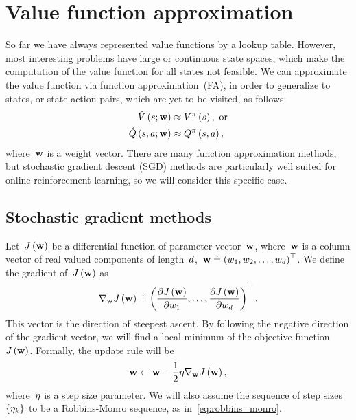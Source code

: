 \section{Value function approximation}
So far we have always represented value functions by a lookup table. However, most interesting problems have large or continuous state spaces, which make the computation of the value function for all states not feasible. We can approximate the value function via function approximation~(FA), in order to generalize to states, or state-action pairs, which are yet to be visited, as follows:
\begin{equation}
\begin{split}
	\approximatestatevalue\left(\state;\valueparameter\right)&\approx\statevalue\policyscript\left(\state\right),~\textnormal{or} \\
	\approximateactionvalue\left(\state,\action;\valueparameter\right)&\approx\actionvalue\policyscript\left(\state,\action\right),
\end{split}
\end{equation}
where~${\mathbf{w}}$ is a weight vector. There are many function approximation methods, but stochastic gradient descent (SGD) methods are particularly well suited for online reinforcement learning, so we will consider this specific case.

\subsection{Stochastic gradient methods}
Let~${J\left(\mathbf{w}\right)}$ be a differential function of parameter vector~${\mathbf{w}}$, where~${\mathbf{w}}$ is a column vector of real valued components of length~${d}$,~${\mathbf{w}\doteq\left(w_{1},w_{2},\dots,w_{d}\right)^{\top}}$. We define the gradient of~${J\left(\mathbf{w}\right)}$ as
\begin{equation}
	\nabla_{\mathbf{w}}J\left(\mathbf{w}\right)\doteq\left(\frac{\partial J\left(\mathbf{w}\right)}{\partial w_{1}},\dots,\frac{\partial J\left(\mathbf{w}\right)}{\partial w_{d}}\right)^{\top}.
\end{equation}
This vector is the direction of steepest ascent. By following the negative direction of the gradient vector, we will find a local minimum of the objective function~${J\left(\mathbf{w}\right)}$. Formally, the update rule will be
\begin{equation}
	\mathbf{w}\gets\mathbf{w}-\frac{1}{2}\eta\nabla_{\mathbf{w}}J\left(\mathbf{w}\right),
\end{equation}
where~${\eta}$ is a step size parameter. We will also assume the sequence of step sizes ${\left\{\eta_{k}\right\}}$ to be a Robbins-Monro sequence, as in~\eqref{eq:robbins_monro}.

